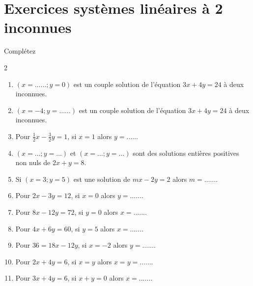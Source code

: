 \documentclass[main.tex]{subfiles}
\begin{document}
\section{Exercices systèmes linéaires à 2 inconnues}
\begin{exercise}Complétez
	\vspace{-0.5em}
\begin{spacing}{2} 
\begin{enumerate}[label=\arabic*),leftmargin =*]  
	\item $(x=\ldots\ldots;y=0)$ est un couple solution de l'équation $3x+4y=24$ à deux inconnues.
	\item $(x=-4;y=\ldots\ldots)$ est un couple solution de l'équation $3x+4y=24$ à deux inconnues.
	\item Pour $\tfrac{1}{2}x-\tfrac{3}{2}y=1$, si $x=1$ alors $y=\ldots\ldots$
	\item $(x=\ldots;y=\ldots)$ et $(x=\ldots;y=\ldots)$ sont des solutions entières positives non nuls de $2x+y=8$. 
	\item Si $(x=3;y=5)$ est une solution de $mx-2y=2$ alors $m=\ldots\ldots$.
	\item Pour $2x-3y=12$, si $x=0$ alors $y=\ldots\ldots$.
	\item Pour $8x-12y=72$, si $y=0$ alors $x=\ldots\ldots$.
	\item Pour $4x+6y=60$, si $y=5$ alors $x=\ldots\ldots$.
	\item Pour $36=18x-12y$, si $x=-2$ alors $y=\ldots\ldots$. 
	\item  Pour $2x+4y=6$, si $x=y$  alors $x=y=\ldots\ldots$. 
	\item  Pour $3x+4y=6$, si $x+y=0$  alors $x=\ldots\ldots$.
\end{enumerate} 
\end{spacing}
\end{exercise}
\vspace{-2em}
\end{document}

